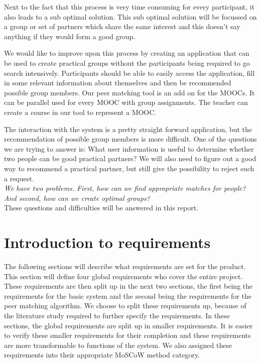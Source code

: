 \documentclass[]{article}
\begin{document}
Next to the fact that this process is very time consuming for every participant, it also leads to a sub optimal solution.
This sub optimal solution will be focussed on a group or set of partners which share the same interest and this doesn't say anything if they would form a good group.

We would like to improve upon this process by creating an application that can be used to create practical groups without the participants being required to go search intensively.
Participants should be able to easily access the application, fill in some relevant information about themselves and then be recommended possible group members.
Our peer matching tool is an add on for the MOOCs. 
It can be parallel used for every MOOC with group assignments.
The teacher can create a course in our tool to represent a MOOC.

The interaction with the system is a pretty straight forward application, but the recommendation of possible group members is more difficult.
One of the questions we are trying to answer is: What user information is useful to determine whether two people can be good practical partners?
We will also need to figure out a good way to recommend a practical partner, but still give the possibility to reject such a request.\\

\emph{We have two problems. First, how can we find appropriate matches for people? And second, how can we create optimal groups?}\\

These questions and difficulties will be answered in this report.

\section{Introduction to requirements}
The following sections will describe what requirements are set for the product.
This section will define four global requirements who cover the entire project.
These requirements are then split up in the next two sections, the first being the requirements for the basic system and the second being the requirements for the peer matching algorithm.
We choose to split these requirements up, because of the literature study required to further specify the requirements.
In these sections, the global requirements are split up in smaller requirements.
It is easier to verify these smaller requirements for their completion and these requirements are more transformable to functions of the system.
We also assigned these requirements into their appropriate MoSCoW \cite{highsmith2001agile} method category.
\end{document}
